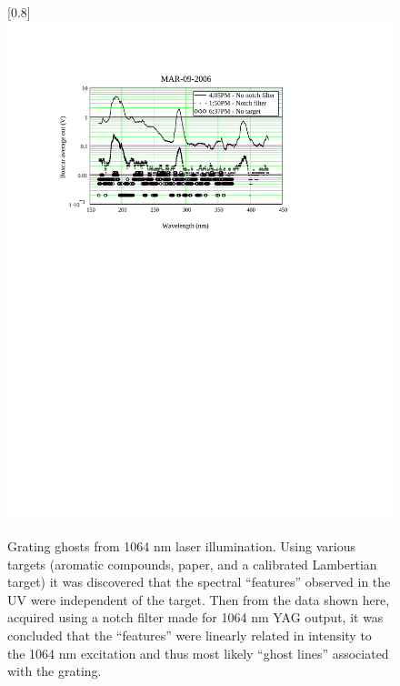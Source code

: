 \begin{figure}
\scalebox{0.8}[0.8]{
\includegraphics[bb=0 470 489 700]
{1064_ghosts/1064_ghosts.pdf}
}
\caption[Grating ghosts from 1064 nm laser illumination]{Grating ghosts from 1064 nm laser illumination. Using various targets (aromatic compounds, paper, and a calibrated Lambertian target) it was discovered that the spectral ``features'' observed in the UV were independent of the target. Then from the data shown here, acquired using a notch filter made for 1064 nm YAG output, it was concluded that the ``features'' were linearly related in intensity to the 1064 nm excitation and thus most likely ``ghost lines'' associated with the grating.}
\label{1064_ghosts}
\end{figure}
